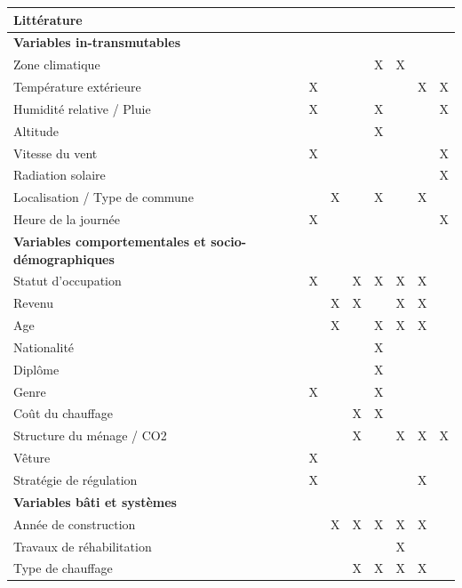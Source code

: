 \begin{table} [H]
\centering
\begin{tabular}{|l||c|c|c|c|c|c|c|}
\hline
\textbf{Littérature} & \cite{Annex-53-1} & \cite{Maresca-09} & \cite{Devaliere-11} & \cite{Cavailhes-11} & \cite{Penot-Antoniou-13} & \cite{Kelly-13} & \cite{Andersen-09} \\
\hline
\hline \rowcolor{gray}\textbf{Variables in-transmutables} & & & & & & & \\
\hline Zone climatique & & & & X & X & & \\
\hline Température extérieure & X & & & & & X & X \\
\hline Humidité relative / Pluie & X & & & X & & & X \\
\hline Altitude & & & & X & & & \\
\hline Vitesse du vent & X & & & & & & X \\
\hline Radiation solaire & & & & & & & X \\
\hline Localisation / Type de commune & & X & & X & & X & \\
\hline Heure de la journée & X & & & & & & X \\
\hline \rowcolor{gray} \textbf{Variables comportementales et \newline socio-démographiques} & & & & & & & \\
\hline Statut d'occupation & X & & X & X & X & X &  \\
\hline Revenu & & X & X & & X & X & \\
\hline Age & & X & & X & X & X & \\
\hline Nationalité & & & & X & & & \\
\hline Diplôme & & & & X & & & \\
\hline Genre & X & & & X & & & \\
\hline Coût du chauffage & & & X & X & & & \\
\hline Structure du ménage / CO2 & & & X & & X & X & X \\
\hline Vêture & X & & & & & & \\
\hline Stratégie de régulation & X & & & & & X & \\
\hline \rowcolor{gray}\textbf{Variables bâti et systèmes} & & & & & & & \\
\hline Année de construction & & X & X & X & X & X & \\
\hline Travaux de réhabilitation & & & & & X & & \\
\hline Type de chauffage & & & X & X & X & X & \\

\end{tabular}
\end{table}
